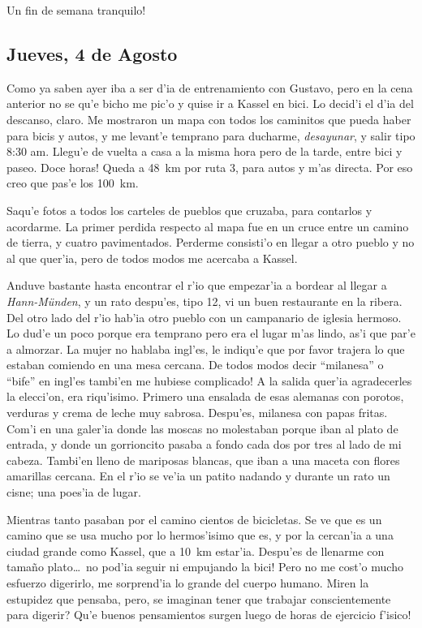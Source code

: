 \textexclamdown Un fin de semana tranquilo!

\subsection*{Jueves, 4 de Agosto}

Como ya saben ayer iba a ser d'ia de entrenamiento con Gustavo, pero en la cena
anterior no se qu'e bicho me pic'o y quise ir a Kassel en bici. Lo decid'i el
d'ia del descanso, claro. Me mostraron un mapa con todos los caminitos que pueda
haber para bicis y autos, y me levant'e temprano para ducharme,
\emph{desayunar}, y salir tipo 8:30 am. Llegu'e de vuelta a casa a la misma hora
pero de la tarde, entre bici y paseo. \textexclamdown Doce horas! Queda a 48~km
por ruta 3, para autos y m'as directa. Por eso creo que pas'e los 100~km.

Saqu'e fotos a todos los carteles de pueblos que cruzaba, para contarlos y
acordarme. La primer perdida respecto al mapa fue en un cruce entre un camino de
tierra, y cuatro pavimentados. Perderme consisti'o en llegar a otro pueblo y no
al que quer'ia, pero de todos modos me acercaba a Kassel.

Anduve bastante hasta encontrar el r'io que empezar'ia a bordear al llegar a
\emph{Hann-M\"unden}, y un rato despu'es, tipo 12, vi un buen restaurante en la
ribera. Del otro lado del r'io hab'ia otro pueblo con un campanario de iglesia
hermoso. Lo dud'e un poco porque era temprano pero era el lugar m'as lindo, as'i
que par'e a almorzar. La mujer no hablaba ingl'es, le indiqu'e que por favor
trajera lo que estaban comiendo en una mesa cercana. \textexclamdown De todos
modos decir ``milanesa'' o ``bife'' en ingl'es tambi'en me hubiese complicado! A
la salida quer'ia agradecerles la elecci'on, era riqu'isimo. Primero una
ensalada de esas alemanas con porotos, verduras y crema de leche muy sabrosa.
Despu'es, milanesa con papas fritas. Com'i en una galer'ia donde las moscas no
molestaban porque iban al plato de entrada, y donde un gorrioncito pasaba a
fondo cada dos por tres al lado de mi cabeza. Tambi'en lleno de mariposas
blancas, que iban a una maceta con flores amarillas cercana. En el r'io se ve'ia
un patito nadando y durante un rato un cisne; una poes'ia de lugar.

Mientras tanto pasaban por el camino cientos de bicicletas. Se ve que es un
camino que se usa mucho por lo hermos'isimo que es, y por la cercan'ia a una
ciudad grande como Kassel, que a 10~km estar'ia. Despu'es de llenarme con
tama\~no plato\ldots\ \textexclamdown no pod'ia seguir ni empujando la bici!
Pero no me cost'o mucho esfuerzo digerirlo, me sorprend'ia lo grande del cuerpo
humano. Miren la estupidez que pensaba, pero, \textquestiondown se imaginan
tener que trabajar conscientemente para digerir? \textexclamdown Qu'e buenos
pensamientos surgen luego de horas de ejercicio f'isico!

